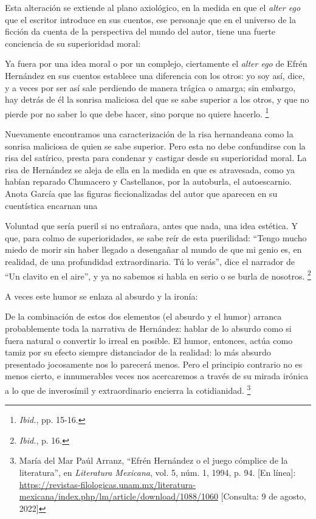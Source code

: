 \documentclass[14pt,twoside,final]{extbook} %
\let\oldfootnote\footnote
\renewcommand\footnote[1]{%
\oldfootnote{\hspace{1mm}#1}}
\begin{document}
Esta alteración se extiende al plano axiológico, en la medida en que el \emph{alter ego} que el escritor introduce en sus cuentos, ese personaje que en el universo de la ficción da cuenta de la perspectiva del mundo del autor, tiene una fuerte conciencia de su superioridad moral:
\begin{quoting}
Ya fuera por una idea moral o por un complejo, ciertamente el \emph{alter ego} de Efrén Hernández en sus cuentos establece una diferencia con los otros: yo soy así, dice, y a veces por ser así sale perdiendo de manera trágica o amarga; sin embargo, hay detrás de él la sonrisa maliciosa del que se sabe superior a los otros, y que no pierde por no saber lo que debe hacer, sino porque no quiere hacerlo.\footnote{\emph{Ibid.}, pp. 15-16.}
\end{quoting}
Nuevamente encontramos una caracterización de la risa hernandeana como la sonrisa maliciosa de quien se sabe superior. Pero esta no debe confundirse con la risa del satírico, presta para condenar y castigar desde su superioridad moral. La risa de Hernández se aleja de ella en la medida en que es atravesada, como ya habían reparado Chumacero y Castellanos, por la autoburla, el autoescarnio. Anota García que las figuras ficcionalizadas del autor que aparecen en su cuentística encarnan una
\begin{quoting}
Voluntad que sería pueril si no entrañara, antes que nada, una idea estética. Y que, para colmo de superioridades, se sabe reír de esta puerilidad: ``Tengo mucho miedo de morir sin haber llegado a desengañar al mundo de que mi genio es, en realidad, de una profundidad extraordinaria. Tú lo verás'', dice el narrador de ``Un clavito en el aire'', y ya no sabemos si habla en serio o se burla de nosotros.\footnote{\emph{Ibid.}, p. 16.}
\end{quoting}
A veces este humor se enlaza al absurdo y la ironía:
\begin{quoting}
De la combinación de estos dos elementos (el absurdo y el humor) arranca probablemente toda la narrativa de Hernández: hablar de lo absurdo como si fuera natural o convertir lo irreal en posible. El humor, entonces, actúa como tamiz por su efecto siempre distanciador de la realidad: lo más absurdo presentado jocosamente nos lo parecerá menos. Pero el principio contrario no es menos cierto, e innumerables veces nos acercaremos a través de su mirada irónica a lo que de inverosímil y extraordinario encierra la cotidianidad.\footnote{María del Mar Paúl Arranz, ``Efrén Hernández o el juego cómplice de la literatura'', en \emph{Literatura Mexicana}, vol. 5, núm. 1, 1994, p. 94. [En línea]: \url{https://revistas-filologicas.unam.mx/literatura-mexicana/index.php/lm/article/download/1088/1060} [Consulta: 9 de agosto, 2022]}
\end{quoting}
\end{document}
